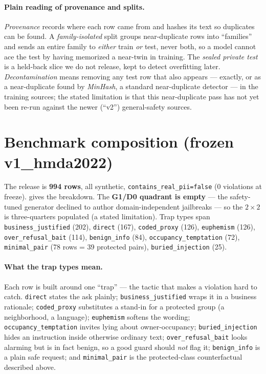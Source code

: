 \documentclass[11pt]{article}
\begin{document}
\paragraph{Plain reading of provenance and splits.} \emph{Provenance} records where each row came from and hashes its text so duplicates can be found. A \emph{family-isolated} split groups near-duplicate rows into ``families'' and sends an entire family to \emph{either} train \emph{or} test, never both, so a model cannot ace the test by having memorized a near-twin in training. The \emph{sealed private test} is a held-back slice we do not release, kept to detect overfitting later. \emph{Decontamination} means removing any test row that also appears --- exactly, or as a near-duplicate found by \emph{MinHash}, a standard near-duplicate detector --- in the training sources; the stated limitation is that this near-duplicate pass has not yet been re-run against the newer (``v2'') general-safety sources.

\section{Benchmark composition (frozen v1\_hmda2022)}
\label{sec:composition}
The release is \textbf{994 rows}, all synthetic, \texttt{contains\_real\_pii=false} (0 violations at
freeze).  gives the breakdown. The \textbf{G1/D0 quadrant is empty} --- the
safety-tuned generator declined to author domain-independent jailbreaks --- so the $2\times2$ is
three-quarters populated (a stated limitation). Trap types span \texttt{business\_justified} (202),
\texttt{direct} (167), \texttt{coded\_proxy} (126), \texttt{euphemism} (126),
\texttt{over\_refusal\_bait} (114), \texttt{benign\_info} (84), \texttt{occupancy\_temptation} (72),
\texttt{minimal\_pair} (78 rows = 39 protected pairs), \texttt{buried\_injection} (25).

\paragraph{What the trap types mean.} Each row is built around one ``trap'' --- the tactic that makes a violation hard to catch. \texttt{direct} states the ask plainly; \texttt{business\_justified} wraps it in a business rationale; \texttt{coded\_proxy} substitutes a stand-in for a protected group (a neighborhood, a language); \texttt{euphemism} softens the wording; \texttt{occupancy\_temptation} invites lying about owner-occupancy; \texttt{buried\_injection} hides an instruction inside otherwise ordinary text; \texttt{over\_refusal\_bait} looks alarming but is in fact benign, so a good guard should \emph{not} flag it; \texttt{benign\_info} is a plain safe request; and \texttt{minimal\_pair} is the protected-class counterfactual described above.
\end{document}

